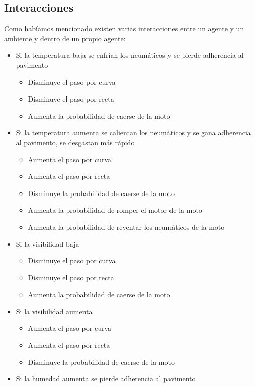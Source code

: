 \subsection{Interacciones}
	Como habíamos mencionado existen varias interacciones entre un agente y un ambiente y dentro de un propio agente:
	\begin{itemize}
		\item Si la temperatura baja se enfrían los neumáticos y se pierde adherencia al pavimento
		\begin{itemize}
			\item Disminuye el paso por curva
			\item Disminuye el paso por recta
			\item Aumenta la probabilidad de caerse de la moto
		\end{itemize} 
		\item Si la temperatura aumenta se calientan los neumáticos y se gana adherencia al pavimento, se desgastan más rápido
		\begin{itemize}
			\item Aumenta el paso por curva
			\item Aumenta el paso por recta
			\item Disminuye la probabilidad de caerse de la moto
			\item Aumenta la probabilidad de romper el motor de la moto
			\item Aumenta la probabilidad de reventar los neumáticos de la moto
		\end{itemize}
		\item Si la visibilidad baja
		\begin{itemize}
			\item Disminuye el paso por curva
			\item Disminuye el paso por recta
			\item Aumenta la probabilidad de caerse de la moto
		\end{itemize}
		\item Si la visibilidad aumenta
		\begin{itemize}
			\item Aumenta el paso por curva
			\item Aumenta el paso por recta
			\item Disminuye la probabilidad de caerse de la moto
		\end{itemize}
		\item Si la humedad aumenta se pierde adherencia al pavimento
		\begin{itemize}

\end{itemize}
\end{itemize}
